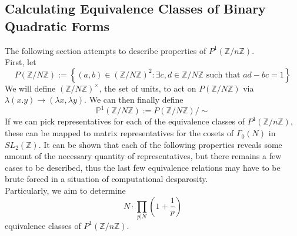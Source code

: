 \documentclass[11pt, oneside]{amsart}
\begin{document}
\subsection{Calculating Equivalence Classes of Binary Quadratic Forms}
The following section attempts to describe properties of $P^1(\mathbb{Z}/ n \mathbb{Z})$.\\
First, let 
$$P(\mathbb{Z} / N \mathbb{Z}) :=\left\{(a, b) \in(\mathbb{Z} / N \mathbb{Z})^{2} : \exists c, d \in \mathbb{Z} / N \mathbb{Z} \text { such that } a d-b c=1\right\}$$
We will define $(\mathbb{Z} / N \mathbb{Z})^{\times}$, the set of units, to act on $P(\mathbb{Z} / N \mathbb{Z})$ via $\lambda(x.y)\rightarrow (\lambda x, \lambda y)$. We can then finally define
$$\mathbb{P}^{1}(\mathbb{Z} / N \mathbb{Z}) :=P(\mathbb{Z} / N \mathbb{Z}) / \sim$$
If we can pick representatives for each of the equivalence classes of $P^1(\mathbb{Z}/ n \mathbb{Z})$, these can be mapped to matrix representatives for the cosets of $\Gamma_0(N)$ in $SL_2(\mathbb{Z})$. It can be shown that each of the following properties reveals some amount of the necessary quantity of representatives, but there remains a few cases to be described, thus the last few equivalence relations may have to be brute forced in a situation of computational desparosity.\\
Particularly, we aim to determine $$N \cdot \prod_{p | N}\left(1+\frac{1}{p}\right)$$ equivalence classes of $P^1(\mathbb{Z}/ n \mathbb{Z})$.
\end{document}
